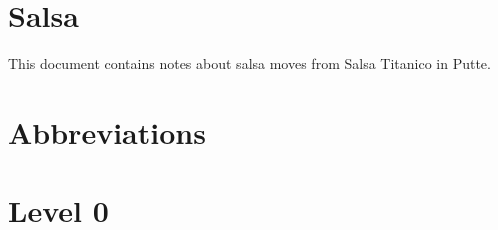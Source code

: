 \documentclass[a4paper, 12pt]{article}
\begin{document}




\newpage


\newpage
\setcounter{page}{1}
\tableofcontents

\newpage
\setcounter{page}{1}

\section{Salsa}
\noindent This document contains notes about salsa moves from Salsa Titanico in Putte.

\section{Abbreviations}


\newpage
\section{Level 0}

\end{document}
